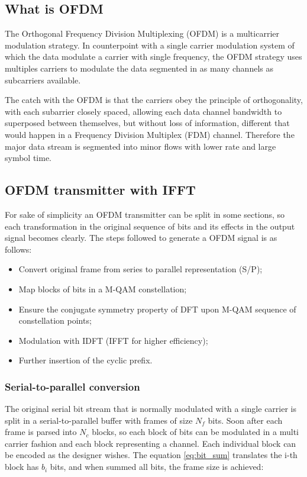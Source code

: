 \subsection{What is OFDM}

The Orthogonal Frequency Division Multiplexing (OFDM) is a multicarrier modulation strategy. In counterpoint with a single carrier modulation system of which the data modulate a carrier with single frequency, the OFDM strategy uses multiples carriers to modulate the data segmented in as many channels as subcarriers available. 

The catch with the OFDM is that the carriers obey the principle of orthogonality, with each subarrier closely spaced, allowing each data channel bandwidth to superposed between themselves, but without loss of information, different that would happen in a Frequency Division Multiplex (FDM) channel. Therefore the major data stream is segmented into minor flows with lower rate and large symbol time.

\subsection{OFDM transmitter with IFFT}

For sake of simplicity an OFDM transmitter can be split in some sections, so each transformation in the original sequence of bits and its effects in the output signal becomes clearly. The steps followed to generate a OFDM signal is as follows:

\begin{itemize}
    \item Convert original frame from series to parallel representation (S/P);
    \item Map blocks of bits in a M-QAM constellation;
    \item Ensure the conjugate symmetry property of DFT upon M-QAM sequence of constellation points;
    \item Modulation with IDFT (IFFT for higher efficiency);
    \item Further insertion of the cyclic prefix.
\end{itemize}

\subsubsection{Serial-to-parallel conversion}

The original serial bit stream that is normally modulated with a single carrier is split in a serial-to-parallel buffer with frames of size $N_f$ bits.  Soon after each frame is parsed into $N_c$ blocks, so each block of bits can be modulated in a multi carrier fashion and each block representing a channel. Each individual block can be encoded as the designer wishes. The equation \ref{eq:bit_sum} translates the i-th block has $b_i$ bits, and when summed all bits, the frame size is achieved:

